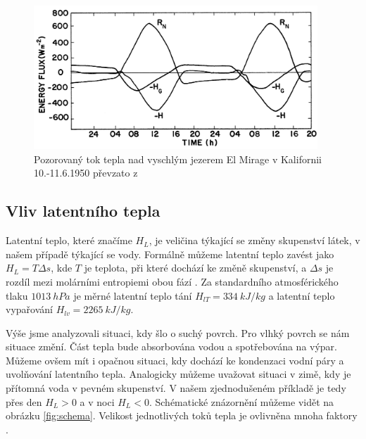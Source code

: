 \begin{figure}
	\centering
	\includegraphics[width=0.95\textwidth]{img/ch1/energy_drylakebed.png}
	\caption{Pozorovaný tok tepla nad vyschlým jezerem El Mirage v Kalifornii 10.-11.6.1950 převzato z \parencite{arya2001}}
	\label{fig:energy_drylakebed}
\end{figure}

\subsection{Vliv latentního tepla}\label{chap:latentheat}
Latentní teplo, které značíme $H_L$, je veličina týkající se změny skupenství látek, v našem případě týkající se vody. Formálně můžeme latentní teplo zavést jako $H_L = T\Delta s$, kde $T$ je teplota, při které dochází ke změně skupenství, a $\Delta s$ je rozdíl mezi molárními entropiemi obou fází \parencite{callen1985}. Za standardního atmosférického tlaku $\SI{1013}{hPa}$ je měrné latentní teplo tání $H_{lT} = \SI{334}{kJ/kg}$ a latentní teplo vypařování $H_{lv} = \SI{2265}{kJ/kg}$. 

Výše jsme analyzovali situaci, kdy šlo o suchý povrch. Pro vlhký povrch se nám situace změní. Část tepla bude absorbována vodou a spotřebována na výpar. Můžeme ovšem mít i opačnou situaci, kdy dochází ke kondenzaci vodní páry a uvolňování latentního tepla. Analogicky můžeme uvažovat situaci v zimě, kdy je přítomná voda v pevném skupenství. V našem zjednodušeném příkladě je tedy přes den $H_L > 0$ a v noci $H_L < 0$. Schématické znázornění můžeme vidět na obrázku \ref{fig:schema}. Velikost jednotlivých toků tepla je ovlivněna mnoha faktory \parencite{arya2001}.

